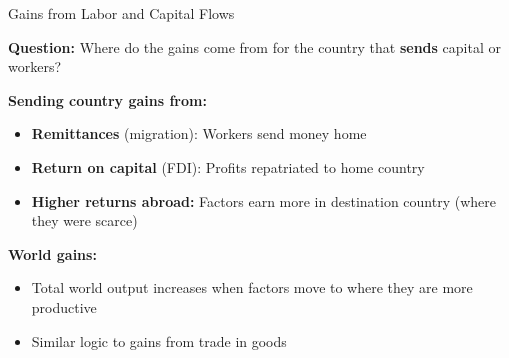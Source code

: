 \begin{frame}{Gains from Labor and Capital Flows}

\textbf{Question:} Where do the gains come from for the country that \textbf{sends} capital or workers?

\vspace{0.3cm}

\textbf{Sending country gains from:}

\begin{itemize}
    \item \textbf{Remittances} (migration): Workers send money home
    
    \vspace{0.2cm}
    
    \item \textbf{Return on capital} (FDI): Profits repatriated to home country
    
    \vspace{0.2cm}
    
    \item \textbf{Higher returns abroad:} Factors earn more in destination country (where they were scarce)
\end{itemize}

\vspace{0.3cm}

\textbf{World gains:}
\begin{itemize}
    \item Total world output increases when factors move to where they are more productive
    \item Similar logic to gains from trade in goods
\end{itemize}

\end{frame}